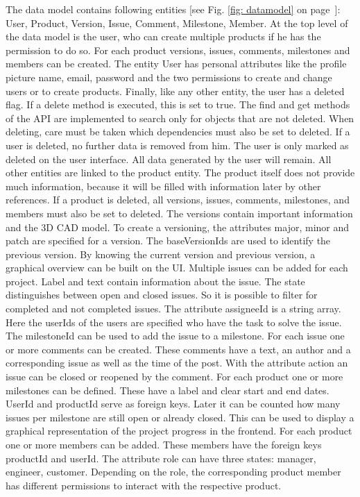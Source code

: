     The data model contains following entities [see Fig. \ref{fig: datamodel} on page~\pageref{fig: datamodel}]: User, Product, Version, Issue, Comment, Milestone, Member. At the top level of the data model is the user, who can create multiple products if he has the permission to do so. For each product versions, issues, comments, milestones and members can be created. The entity User has personal attributes like the profile picture name, email, password and the two permissions to create and change users or to create products. Finally, like any other entity, the user has a deleted flag. If a delete method is executed, this is set to true. The find and get methods of the API are implemented to search only for objects that are not deleted. When deleting, care must be taken which dependencies must also be set to deleted. If a user is deleted, no further data is removed from him. The user is only marked as deleted on the user interface. All data generated by the user will remain. All other entities are linked to the product entity. The product itself does not provide much information, because it will be filled with information later by other references. If a product is deleted, all versions, issues, comments, milestones, and members must also be set to deleted. The versions contain important information and the 3D CAD model. To create a versioning, the attributes major, minor and patch are specified for a version. The baseVersionIds are used to identify the previous version. By knowing the current version and previous version, a graphical overview can be built on the UI. Multiple issues can be added for each project. Label and text contain information about the issue. The state distinguishes between open and closed issues. So it is possible to filter for completed and not completed issues. The attribute assigneeId is a string array. Here the userIds of the users are specified who have the task to solve the issue. The milestoneId can be used to add the issue to a milestone. For each issue one or more comments can be created. These comments have a text, an author and a corresponding issue as well as the time of the post. With the attribute action an issue can be closed or reopened by the comment. For each product one or more milestones can be defined. These have a label and clear start and end dates. UserId and productId serve as foreign keys. Later it can be counted how many issues per milestone are still open or already closed. This can be used to display a graphical representation of the project progress in the frontend. For each product one or more members can be added. These members have the foreign keys productId and userId. The attribute role can have three states: manager, engineer, customer. Depending on the role, the corresponding product member has different permissions to interact with the respective product.

